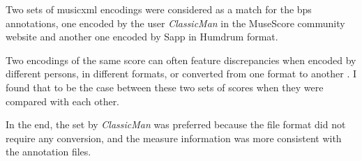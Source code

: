 
Two sets of \gls{musicxml} encodings were considered as a
match for the \gls{bps} annotations, one encoded by the user
\emph{ClassicMan} in the MuseScore community
website
and another one encoded by Sapp in Humdrum
format.

Two encodings of the same score can often feature
discrepancies when encoded by different persons, in
different formats, or converted from one format to another
\parencite{napoleslopez2018encoding,
napoleslopez2019effects}. I found that to be the case
between these two sets of scores when they were compared
with each
other.

In the end, the set by \emph{ClassicMan} was preferred
because the file format did not require any conversion, and
the measure information was more consistent with the
annotation files.